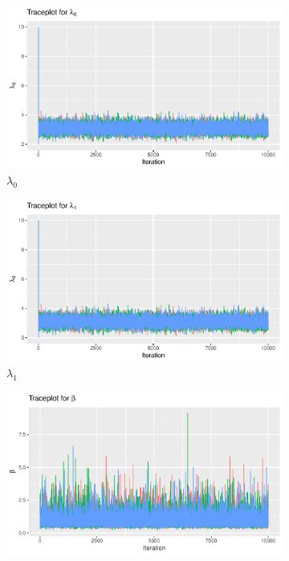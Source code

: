\begin{figure}[H]
    \centering
    \begin{subfigure}[b]{0.49\textwidth}
        \centering
        \includegraphics[width = \textwidth]{Images/mixing_lambda_0.pdf}
        \caption{$\lambda_0$ }
        \label{fig:sim_mixing_lam0}
    \end{subfigure}
    \begin{subfigure}[b]{0.49\textwidth}
        \centering
        \includegraphics[width = \textwidth]{Images/mixing_lambda_1.pdf}
        \caption{$\lambda_1$}
        \label{fig:sim_mixing_lam1}
    \end{subfigure}
    \begin{subfigure}[b]{0.49\textwidth}
        \centering
        \includegraphics[width = \textwidth]{Images/mixing_beta.pdf}

\end{subfigure}
\end{figure}
